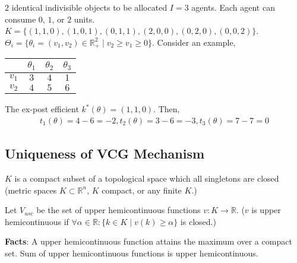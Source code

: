 \documentclass[11pt]{elegantbook_2}
\begin{document}
\begin{example}
    $2$ identical indivisible objects to be allocated $I=3$ agents. Each agent can consume $0$, $1$, or $2$ units. $K=\{(1,1,0),(1,0,1),(0,1,1),(2,0,0),(0,2,0),(0,0,2)\}$. $\Theta_i=\{\theta_i=(v_1,v_2)\in \mathbb{R}^2_+\mid v_2\geq v_1\geq 0\}$. Consider an example,
    \begin{center}
        \begin{tabular}{c|c|c|c}
            \hline
                &$\theta_1$ &$\theta_2$&$\theta_3$\\
            \hline
                $v_1$&$3$ &$4$&$1$\\
            \hline
                $v_2$&$4$ &$5$&$6$\\
            \hline
        \end{tabular}
    \end{center}
    The ex-post efficient $k^*(\theta)=(1,1,0)$. Then,
    \begin{equation}
        \begin{aligned}
            t_1(\theta)=4-6=-2, t_2(\theta)=3-6=-3, t_3(\theta)=7-7=0
        \end{aligned}
        \nonumber
    \end{equation}
\end{example}


\subsection{Uniqueness of VCG Mechanism}
\begin{assumption}
    $K$ is a compact subset of a topological space which all singletons are closed (metric spaces $K\subset \mathbb{R}^n$, $K$ compact, or any finite $K$.)
\end{assumption}

Let $V_{usc}$ be the set of upper hemicontinuous functions $v: K \rightarrow \mathbb{R}$. ($v$ is upper hemicontinuous if $\forall \alpha\in \mathbb{R}: \{k\in K\mid v(k)\geq \alpha\}$ is closed.)

\textbf{Facts}: A upper hemicontinuous function attains the maximum over a compact set. Sum of upper hemicontinuous functions is upper hemicontinuous.
\end{document}
